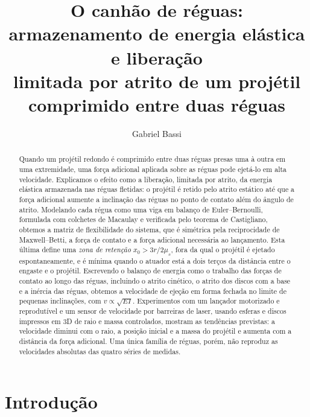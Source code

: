 \documentclass[aps,pre,twocolumn,superscriptaddress,nofootinbib,floatfix]{revtex4-2}
\begin{document}
\renewcommand{\figurename}{Fig.}
\renewcommand{\tablename}{Tabela}

\title{O canhão de réguas: armazenamento de energia elástica e liberação\\ limitada por atrito de um projétil comprimido entre duas réguas}

\author{Gabriel Bassi}

\begin{abstract}
Quando um projétil redondo é comprimido entre duas réguas presas uma à outra em uma extremidade, uma força adicional aplicada sobre as réguas pode ejetá-lo em alta velocidade. Explicamos o efeito como a liberação, limitada por atrito, da energia elástica armazenada nas réguas fletidas: o projétil é retido pelo atrito estático até que a força adicional aumente a inclinação das réguas no ponto de contato além do ângulo de atrito. Modelando cada régua como uma viga em balanço de Euler--Bernoulli, formulada com colchetes de Macaulay e verificada pelo teorema de Castigliano, obtemos a matriz de flexibilidade do sistema, que é simétrica pela reciprocidade de Maxwell--Betti, a força de contato e a força adicional necessária ao lançamento. Esta última define uma \emph{zona de retenção} $x_0>3r/2\mu_s$, fora da qual o projétil é ejetado espontaneamente, e é mínima quando o atuador está a dois terços da distância entre o engaste e o projétil. Escrevendo o balanço de energia como o trabalho das forças de contato ao longo das réguas, incluindo o atrito cinético, o atrito dos discos com a base e a inércia das réguas, obtemos a velocidade de ejeção em forma fechada no limite de pequenas inclinações, com $v\propto\sqrt{EI}$. Experimentos com um lançador motorizado e reprodutível e um sensor de velocidade por barreiras de laser, usando esferas e discos impressos em 3D de raio e massa controlados, mostram as tendências previstas: a velocidade diminui com o raio, a posição inicial e a massa do projétil e aumenta com a distância da força adicional. Uma única família de réguas, porém, não reproduz as velocidades absolutas das quatro séries de medidas.
\end{abstract}

\maketitle

\section{Introdução}
\label{sec:intro}
\end{document}
